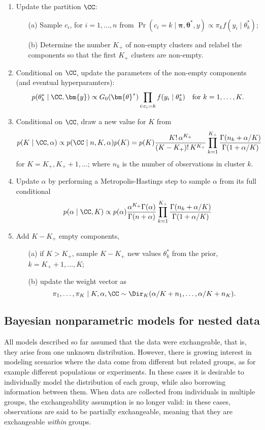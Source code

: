 \begin{enumerate}
	\item Update the partition $\CC$:
	\begin{enumerate}
		\item[(a)] Sample $c_i$, for $i=1,\dots,n$ from $\Pr(c_i = k \mid \bm{\pi}, \bm{\theta}^*, y)\propto \pi_k f(y_i\mid\theta^*_k)$;
		\item[(b)] Determine the number $K_+$ of non-empty clusters and relabel the components so that the first $K_+$ clusters are non-empty.
	\end{enumerate}
	\item Conditional on $\CC$, update the parameters of the non-empty components (and eventual hyperparamters): $$p(\theta^*_k\mid \CC,\bm{y}) \propto G_0(\bm{\theta}^*) \prod_{i:c_i=k} f(y_i\mid\theta^*_k)\quad \text{for } k = 1,\dots,K.$$
	\item Conditional on $\CC$, draw a new value for $K$ from
	\begin{equation*}
	p(K\mid \CC, \alpha) \propto p(\CC\mid n, K, \alpha) p(K) = p(K) \frac{K!\,\alpha^{K_+}}{(K-K_+)!\,K^{K_+}} \prod_{k=1}^{K_+} \frac{\Gamma(n_k + \alpha/K)}{\Gamma(1+\alpha/K)}
	\end{equation*}
	for $K = K_+, K_++1,\dots$; where $n_k$ is the number of observations in cluster $k$.
	\item Update $\alpha$ by performing a Metropolis-Hastings step to sample $\alpha$ from its full conditional 
	$$ p(\alpha\mid\CC,K) \propto p(\alpha) \frac{\alpha^{K_+}\Gamma(\alpha)}{\Gamma(n+\alpha)} \prod_{k=1}^{K_+} \frac{\Gamma(n_k + \alpha/K)}{\Gamma(1+\alpha/K)} $$
	\item Add $K-K_+$ empty components,
	\begin{itemize}
		\item[(a)] if $K>K_+$, sample $K-K_+$ new values $\theta^*_k$ from the prior, $k = K_+ + 1,\dots,K$;
		\item[(b)] update the weight vector as $$\pi_1,\dots,\pi_K \mid K, \alpha, \CC \sim \Dir_K(\alpha/K + n_1, \dots, \alpha/K + n_K).$$ 
	\end{itemize}
\end{enumerate}




\subsection{Bayesian nonparametric models for nested data}
All models described so far assumed that the data were exchangeable, that is, they arise from one unknown distribution. However, there is growing interest in modeling scenarios where the data come from different but related groups, as for example different populations or experiments. In these cases it is desirable to individually model the distribution of each group, while also borrowing information between them.
When data are collected from individuals in multiple groups, the exchangeability assumption is no longer valid: in these cases, observations are said to be partially exchangeable, meaning that they are exchangeable \textit{within} groups.

